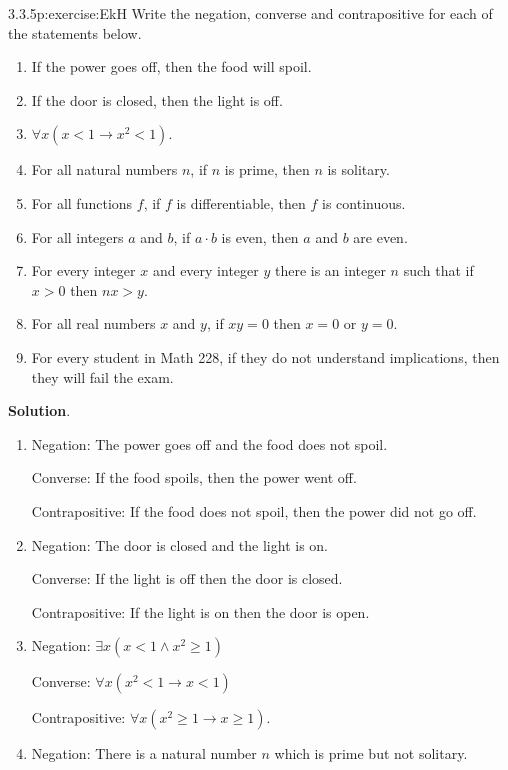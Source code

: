 \documentclass[twoside,11pt,]{book}
\newcommand{\blocktitlefont}{\relax}
\numberwithin{equation}{chapter}
\newcommand{\imp}{\rightarrow}
\newcommand{\lt}{<}
\begin{document}
\begin{divisionsolution}{3.3.5}{}{p:exercise:EkH}%
Write the negation, converse and contrapositive for each of the statements below.%
\begin{enumerate}[label=(\alph*)]
\item{}If the power goes off, then the food will spoil.%
\item{}If the door is closed, then the light is off.%
\item{}\(\forall x (x \lt 1 \imp x^2 \lt 1)\).%
\item{}For all natural numbers \(n\), if \(n\) is prime, then \(n\) is solitary.%
\item{}For all functions \(f\), if \(f\) is differentiable, then \(f\) is continuous.%
\item{}For all integers \(a\) and \(b\), if \(a\cdot b\) is even, then \(a\) and \(b\) are even.%
\item{}For every integer \(x\) and every integer \(y\) there is an integer \(n\) such that if \(x > 0\) then \(nx > y\).%
\item{}For all real numbers \(x\) and \(y\), if \(xy = 0\) then \(x = 0\) or \(y = 0\).%
\item{}For every student in Math 228, if they do not understand implications, then they will fail the exam.%
\end{enumerate}
%
\par\smallskip%
\noindent\textbf{\blocktitlefont Solution}.\quad{}%
\begin{enumerate}[label=(\alph*)]
\item{}Negation: The power goes off and the food does not spoil.%
\par
Converse: If the food spoils, then the power went off.%
\par
Contrapositive: If the food does not spoil, then the power did not go off.%
\item{}Negation: The door is closed and the light is on.%
\par
Converse: If the light is off then the door is closed.%
\par
Contrapositive: If the light is on then the door is open.%
\item{}Negation: \(\exists x (x \lt 1 \wedge x^2 \ge 1)\)%
\par
Converse: \(\forall x( x^2 \lt 1 \imp x \lt 1)\)%
\par
Contrapositive: \(\forall x (x^2 \ge 1 \imp x \ge 1)\).%
\item{}Negation: There is a natural number \(n\) which is prime but not solitary.%

\end{enumerate}
\end{divisionsolution}
\end{document}
